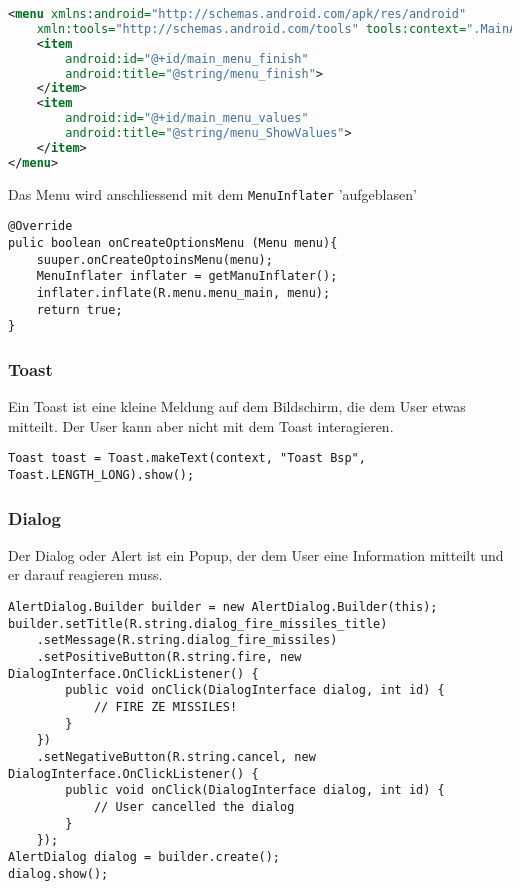 \documentclass[a4paper, 11pt]{article}
\newcommand{\code}[1]{\texttt{#1}}
\begin{document}
\begin{lstlisting}[language=xml, captionpos=b, caption={Beispiel eines Menu Layouts}]
<menu xmlns:android="http://schemas.android.com/apk/res/android"
	xmln:tools="http://schemas.android.com/tools" tools:context=".MainActivity">
	<item
		android:id="@+id/main_menu_finish"
		android:title="@string/menu_finish">
	</item>
	<item
		android:id="@+id/main_menu_values"
		android:title="@string/menu_ShowValues">
	</item>
</menu>
\end{lstlisting}

Das Menu wird anschliessend mit dem \code{MenuInflater} 'aufgeblasen'

\begin{lstlisting}[captionpos=b, caption={Beispiel des Menu-Inflators}]
@Override
pulic boolean onCreateOptionsMenu (Menu menu){
	suuper.onCreateOptoinsMenu(menu);
	MenuInflater inflater = getManuInflater();
	inflater.inflate(R.menu.menu_main, menu);
	return true;
}
\end{lstlisting}

\subsubsection{Toast}
Ein Toast ist eine kleine Meldung auf dem Bildschirm, die dem User etwas mitteilt. Der User kann aber nicht mit dem Toast interagieren.

\begin{lstlisting}[caption={Toast-Beispiel}]
Toast toast = Toast.makeText(context, "Toast Bsp", Toast.LENGTH_LONG).show();
\end{lstlisting}

\subsubsection{Dialog}
Der Dialog oder Alert ist ein Popup, der dem User eine Information mitteilt und er darauf reagieren muss.

\begin{lstlisting}[caption={Alert-Beispiel}]
AlertDialog.Builder builder = new AlertDialog.Builder(this);
builder.setTitle(R.string.dialog_fire_missiles_title)
	.setMessage(R.string.dialog_fire_missiles)
	.setPositiveButton(R.string.fire, new DialogInterface.OnClickListener() {
		public void onClick(DialogInterface dialog, int id) {
			// FIRE ZE MISSILES!
		}
	})
	.setNegativeButton(R.string.cancel, new DialogInterface.OnClickListener() {
		public void onClick(DialogInterface dialog, int id) {
			// User cancelled the dialog
		}
	});
AlertDialog dialog = builder.create();
dialog.show();
\end{lstlisting}
\end{document}
